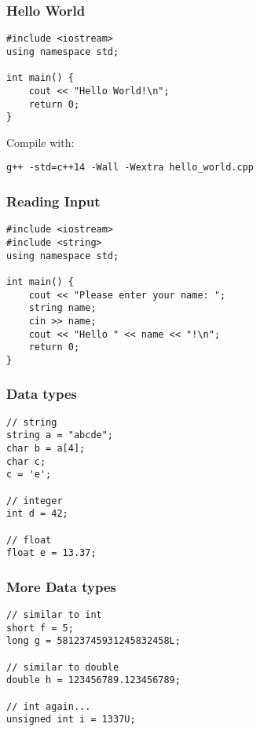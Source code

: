 \begin{frame}[fragile]
    \frametitle{Hello World}
\begin{lstlisting}
#include <iostream>
using namespace std;

int main() {
    cout << "Hello World!\n";
    return 0;
}
\end{lstlisting}
Compile with:
\begin{lstlisting}[numbers=none]
g++ -std=c++14 -Wall -Wextra hello_world.cpp
\end{lstlisting}
\end{frame}

\begin{frame}[fragile]
    \frametitle{Reading Input}
\begin{lstlisting}
#include <iostream>
#include <string>
using namespace std;

int main() {
    cout << "Please enter your name: ";
    string name;
    cin >> name;
    cout << "Hello " << name << "!\n";
    return 0;
}
\end{lstlisting}
\end{frame}

\begin{frame}[fragile]
    \frametitle{Data types}
\begin{lstlisting}
// string
string a = "abcde";
char b = a[4];
char c;
c = 'e';

// integer
int d = 42;

// float
float e = 13.37;
\end{lstlisting}
\end{frame}

\begin{frame}[fragile]
    \frametitle{More Data types}
\begin{lstlisting}
// similar to int
short f = 5;
long g = 58123745931245832458L;

// similar to double
double h = 123456789.123456789;

// int again...
unsigned int i = 1337U;
\end{lstlisting}
\end{frame}


